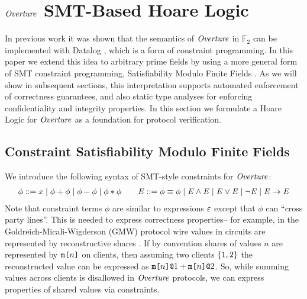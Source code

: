 \section{$\mathit{Overture}$ SMT-Based Hoare Logic}
\label{section-smt}

In previous work it was shown that the semantics of $\mathit{Overture}$ in
$\mathbb{F}_2$ can be implemented with Datalog
\cite{skalka-near-ppdp24}, which is a form of constraint
programming. In this paper we extend this idea to arbitrary prime
fields by using a more general form of SMT constraint programming,
Satisfiability Modulo Finite Fields \cite{SMFF}. As we will show in
subsequent sections, this interpretation supports automated
enforcement of correctness guarantees, and also static type analyses
for enforcing confidentiality and integrity properties.
In this section we formulate a Hoare Logic for $\mathit{Overture}$
as a foundation for protocol verification.

\subsection{Constraint Satisfiability Modulo Finite Fields}

We introduce the following syntax of SMT-style constraints for
$\mathit{Overture}$:
$$
\begin{array}{rcl}
  \phi ::= x \mid \phi + \phi \mid \phi - \phi \mid \phi * \phi  \qquad
  \mathit{E} ::= \phi \equiv \phi \mid \mathit{E} \wedge \mathit{E} \mid \mathit{E} \vee \mathit{E} \mid \neg\mathit{E} \mid \mathit{E} \rightarrow \mathit{E}
\end{array}
$$
%
Note that constraint terms $\phi$ are similar to expressions $\varepsilon$
except that $\phi$ can ``cross party lines''. This is needed
to express correctness properties-- for example, in the
Goldreich-Micali-Wigderson (GMW) protocol wire values in circuits are
represented by reconstructive shares \cite{evans2018pragmatic}.  If by
convention shares of values $n$ are represented by $\texttt{m[}n\texttt{]}$ on
clients, then assuming two clients $\{ 1,2 \}$ the reconstructed
value can be expressed as $\texttt{m[}n\texttt{]}\texttt{@}1 + \texttt{m[}n\texttt{]}\texttt{@}2$.  So, while summing
values across clients is disallowed in $\mathit{Overture}$ protocols, we can
express properties of shared values via constraints.

%
%  
%  

